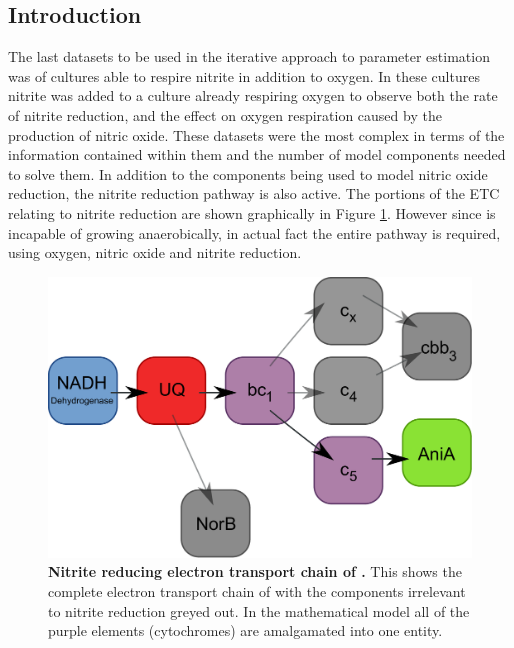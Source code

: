 \subsection{Introduction}

The last datasets to be used in the iterative approach to parameter estimation was of cultures able to respire nitrite in addition to oxygen. In these cultures nitrite was added to a culture already respiring oxygen to observe both the rate of nitrite reduction, and the effect on oxygen respiration caused by the production of nitric oxide. These datasets were the most complex in terms of the information contained within them and the number of model components needed to solve them. In addition to the components being used to model nitric oxide reduction, the nitrite reduction pathway is also active. The portions of the ETC relating to nitrite reduction are shown graphically in Figure \ref{fig:no2_resp_chain}. However since \Nsm{} is incapable of growing anaerobically, in actual fact the entire pathway is required, using oxygen, nitric oxide and nitrite reduction.
\begin{figure}[tbp]
  \centering
    \includegraphics[width=14cm]{07-nitritereduction/data/no2_resp_chain.pdf}
    \caption[Nitrite reducing electron transport chain of \Nm{}]{{\bf Nitrite reducing electron transport chain of \Nm{}.} This shows the complete electron transport chain of \Nsm{} with the components irrelevant to nitrite reduction greyed out. In the mathematical model all of the purple elements (cytochromes) are amalgamated into one entity.
  \label{fig:no2_resp_chain}}
\end{figure}

